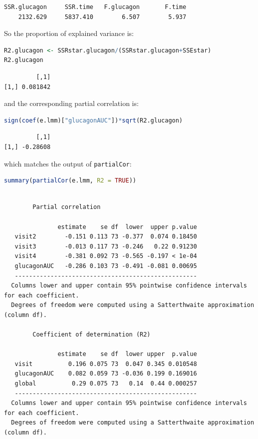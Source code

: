 \documentclass[12pt]{article}
\begin{document}
\label{}
\begin{verbatim}
SSR.glucagon     SSR.time   F.glucagon       F.time 
    2132.629     5837.410        6.507        5.937
\end{verbatim}


So the proportion of explained variance is:
\begin{lstlisting}[language=r,numbers=none]
R2.glucagon <- SSRstar.glucagon/(SSRstar.glucagon+SSEstar)
R2.glucagon
\end{lstlisting}

\label{}
\begin{verbatim}
         [,1]
[1,] 0.081842
\end{verbatim}


and the corresponding partial correlation is:
\begin{lstlisting}[language=r,numbers=none]
sign(coef(e.lmm)["glucagonAUC"])*sqrt(R2.glucagon)
\end{lstlisting}

\label{}
\begin{verbatim}
         [,1]
[1,] -0.28608
\end{verbatim}


which matches the output of \texttt{partialCor}:
\begin{lstlisting}[language=r,numbers=none]
summary(partialCor(e.lmm, R2 = TRUE))
\end{lstlisting}

\label{}
\begin{verbatim}

		Partial correlation 

               estimate    se df  lower  upper p.value
   visit2        -0.151 0.113 73 -0.377  0.074 0.18450
   visit3        -0.013 0.117 73 -0.246   0.22 0.91230
   visit4        -0.381 0.092 73 -0.565 -0.197 < 1e-04
   glucagonAUC   -0.286 0.103 73 -0.491 -0.081 0.00695
   --------------------------------------------------- 
  Columns lower and upper contain 95% pointwise confidence intervals for each coefficient.
  Degrees of freedom were computed using a Satterthwaite approximation (column df). 

		Coefficient of determination (R2)

               estimate    se df  lower upper  p.value
   visit          0.196 0.075 73  0.047 0.345 0.010548
   glucagonAUC    0.082 0.059 73 -0.036 0.199 0.169016
   global          0.29 0.075 73   0.14  0.44 0.000257
   --------------------------------------------------- 
  Columns lower and upper contain 95% pointwise confidence intervals for each coefficient.
  Degrees of freedom were computed using a Satterthwaite approximation (column df).
\end{verbatim}
\end{document}
